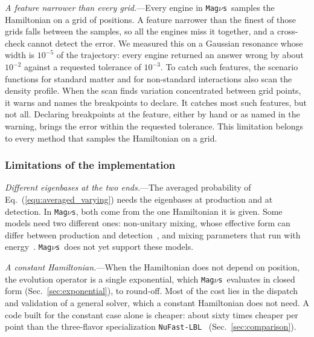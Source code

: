 \documentclass[final,5p,times,twocolumn,sort,compress]{elsarticle}
\makeatletter
\newcommand{\eq}{Eq.}
\DeclareRobustCommand{\_}{%
  \ifmmode\nfss@text{\textunderscore}\else\textunderscore\allowbreak\fi}
\newcommand{\equ}[1]{\eq~(\ref{equ:#1})}
\newcommand{\magnus}{{\tt Mag}\ensuremath{\nu}{\tt s}}
\makeatother
\begin{document}
\textit{A feature narrower than every grid.}---Every engine in \magnus\ samples the Hamiltonian on a grid of positions. A feature narrower than the finest of those grids falls between the samples, so all the engines miss it together, and a cross-check cannot detect the error. We measured this on a Gaussian resonance whose width is $10^{-5}$ of the trajectory: every engine returned an answer wrong by about $10^{-2}$ against a requested tolerance of $10^{-3}$. To catch such features, the scenario functions for standard matter and for non-standard interactions also scan the density profile. When the scan finds variation concentrated between grid points, it warns and names the breakpoints to declare. It catches most such features, but not all. Declaring breakpoints at the feature, either by hand or as named in the warning, brings the error within the requested tolerance. This limitation belongs to every method that samples the Hamiltonian on a grid.


\subsubsection{Limitations of the implementation}
\label{sec:implementation_limits}

\textit{Different eigenbases at the two ends.}---The averaged probability of \equ{averaged_varying} needs the eigenbases at production and at detection. In \magnus, both come from the one Hamiltonian it is given. Some models need two different ones: non-unitary mixing, whose effective form can differ between production and detection\ \cite{Antusch:2014woa, Blennow:2016jkn, Fong:2022oim}, and mixing parameters that run with energy\ \cite{Antusch:2003kp, Antusch:2005gp, Bustamante:2010bf, Babu:2021cxe, Babu:2022non, Ge:2024ibn, Bustamante:2026zst, Bustamante:2026aur}. \magnus\ does not yet support these models.

\smallskip

\textit{A constant Hamiltonian.}---When the Hamiltonian does not depend on position, the evolution operator is a single exponential, which \magnus\ evaluates in closed form (Sec.~\ref{sec:exponential}), to round-off. Most of the cost lies in the dispatch and validation of a general solver, which a constant Hamiltonian does not need. A code built for the constant case alone is cheaper: about sixty times cheaper per point than the three-flavor specialization {\tt NuFast-LBL}~\cite{Denton:2024pzc} (Sec.~\ref{sec:comparison}).
\end{document}
